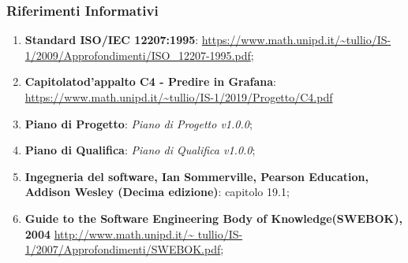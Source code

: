 \subsubsection{Riferimenti Informativi}
\begin{enumerate}
	\item \textbf{Standard ISO/IEC 12207:1995}: 
	\url{https://www.math.unipd.it/~tullio/IS-1/2009/Approfondimenti/ISO_12207-1995.pdf};
	\item \textbf{Capitolato\glosp d'appalto C4 - Predire in Grafana}:  \url{https://www.math.unipd.it/~tullio/IS-1/2019/Progetto/C4.pdf}
	\item \textbf{Piano di Progetto}: \textit{Piano di Progetto v1.0.0};
	\item \textbf{Piano di Qualifica}: \textit{Piano di Qualifica v1.0.0};
	\item \textbf{Ingegneria del software, Ian Sommerville, Pearson Education, Addison Wesley (Decima edizione)}: capitolo 19.1;
	\item \textbf{Guide to the Software Engineering Body of Knowledge(SWEBOK), 2004}
		\url{http://www.math.unipd.it/~	tullio/IS-1/2007/Approfondimenti/SWEBOK.pdf};

	
	
	
	
	
	
\end{enumerate}


